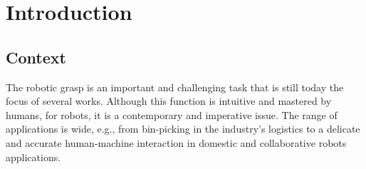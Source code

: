 \chapter{Introduction}
\label{Ch:Introducao}

\section{Context}

\sloppy %
The robotic grasp is an important and challenging task that is still today the focus of several works. Although this function is intuitive and mastered by humans, for robots, it is a contemporary and imperative issue. The range of applications is wide, e.g., from bin-picking in the industry's logistics to a delicate and accurate human-machine interaction in domestic and collaborative robots applications.


